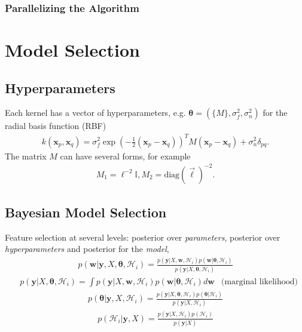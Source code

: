\documentclass[twoside,english]{uiofysmaster}
\begin{document}
\subsubsection{Parallelizing the Algorithm}






\section{Model Selection}

\subsection{Hyperparameters}

Each kernel has a vector of hyperparameters, e.g. $\boldsymbol{\theta} = (\{M\}, \sigma^2_f, \sigma_n^2)$ for the radial basis function (RBF)
\begin{align}
k(\textbf{x}_p, \textbf{x}_q) = \sigma_f^2 \exp (- \frac{1}{2} (\textbf{x}_p - \textbf{x}_q))^T M (\textbf{x}_p - \textbf{x}_q) + \sigma_n^2 \delta_{pq}.
\end{align}
The matrix $M$ can have several forms, for example
\begin{align}
M_1 = \ell^{-2} \mathbb{I} , M_2 = \text{diag}(\vec{\ell})^{-2}.
\end{align}

\subsection{Bayesian Model Selection}

Feature selection at several levels: posterior over \textit{parameters}, posterior over \textit{hyperparameters} and posterior for the \textit{model},
\begin{align}
p(\textbf{w}| \textbf{y}, X, \boldsymbol{\theta}, \mathcal{H}_i) = \frac{p(\textbf{y} | X, \textbf{w}, \mathcal{H}_i) p(\textbf{w}|\boldsymbol{\theta}, \mathcal{H}_i)}{p(\textbf{y}|X, \boldsymbol{\theta}, \mathcal{H}_i)}
\end{align}
\begin{align}
&p(\textbf{y}|X, \boldsymbol{\theta}, \mathcal{H}_i) = \int p(\textbf{y} | X, \textbf{w}, \mathcal{H}_i)p(\textbf{w}| \boldsymbol{\theta}, \mathcal{H}_i) d \textbf{w} & \text{(marginal likelihood)}
\end{align}
\begin{align}
p( \boldsymbol{\theta}| \textbf{y}, X, \mathcal{H}_i) = \frac{p(\textbf{y} | X, \boldsymbol{\theta}, \mathcal{H}_i) p(\boldsymbol{\theta}| \mathcal{H}_i)}{p(\textbf{y}|X,  \mathcal{H}_i)}
\end{align}
\begin{align}
p(\mathcal{H}_i| \textbf{y}, X) = \frac{p(\textbf{y} | X, \mathcal{H}_i) p( \mathcal{H}_i)}{p(\textbf{y}|X)}
\end{align}
\end{document}
